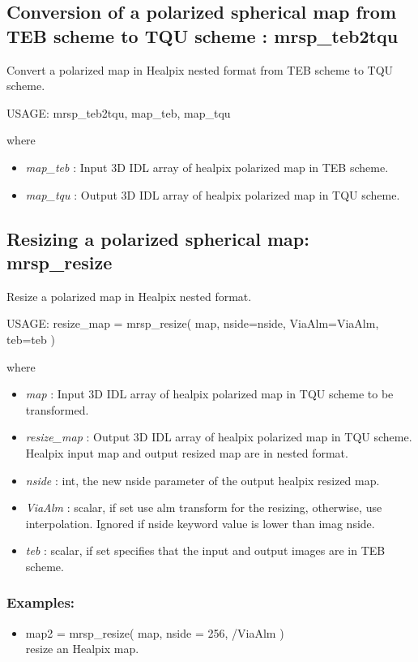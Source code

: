 \subsection{Conversion of a polarized spherical map from TEB scheme to TQU scheme : mrsp\_teb2tqu}
Convert a polarized map in Healpix nested format from TEB scheme to TQU scheme.
{\bf
\begin{center}
     USAGE: mrsp\_teb2tqu, map\_teb, map\_tqu
\end{center}}
where
\begin{itemize}
\item {\em map\_teb} : Input 3D IDL array of healpix polarized map in TEB scheme.
\item {\em map\_tqu} : Output 3D IDL array of healpix polarized map in TQU scheme.
\end{itemize}



\subsection{Resizing a polarized spherical map: mrsp\_resize}
Resize a polarized map in Healpix nested format.
{\bf
\begin{center}
     USAGE: resize\_map = mrsp\_resize( map, nside=nside, ViaAlm=ViaAlm, teb=teb )
\end{center}}
where
\begin{itemize}
\item {\em map} : Input 3D IDL array of healpix polarized map in TQU scheme to be transformed.
\item {\em resize\_map} : Output 3D IDL array of healpix polarized map in TQU scheme. Healpix input map and output resized map are in nested format.
\item {\em nside} : int, the new nside parameter of the output healpix resized map.
\item {\em ViaAlm} : scalar, if set use alm transform for the resizing, otherwise, use interpolation. 
Ignored if nside keyword value is lower than imag nside.
\item {\em teb} : scalar, if set specifies that the input and output images are in TEB scheme.
\end{itemize}

\subsubsection*{Examples:} 
\begin{itemize}
\item map2 = mrsp\_resize( map, nside = 256, /ViaAlm ) \\
resize an Healpix map.
\end{itemize}



